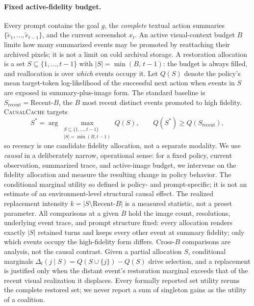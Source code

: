 \documentclass[letterpaper]{article} %
\newcommand{\method}{\textsc{CausalCache}}
\begin{document}
\paragraph{Fixed active-fidelity budget.}
Every prompt contains the goal $g$, the \emph{complete} textual action
summaries $\{\tilde e_1,\ldots,\tilde e_{t-1}\}$, and the current screenshot
$x_t$. An active visual-context budget $B$ limits how many summarized events
may be promoted by reattaching their archived pixels; it is not a limit on
cold archival storage. A restoration allocation is a set
$S\subseteq\{1,\ldots,t-1\}$ with $|S|=\min(B,\,t{-}1)$: the budget is
always filled, and reallocation is over \emph{which} events occupy it. Let
$Q(S)$ denote the policy's mean target-token log-likelihood of the successful
next action when events in $S$ are exposed in summary-plus-image form. The
standard baseline is $S_{\mathrm{recent}}=\mathrm{Recent}\text{-}B$, the $B$
most recent distinct events promoted to high fidelity. \method{} targets
\begin{equation}
S^{*}=\arg\max_{\substack{S\subseteq\{1,\ldots,t-1\}\\ |S|=\min(B,t-1)}} Q(S),
\qquad
Q(S^{*})\ge Q(S_{\mathrm{recent}}),
\label{eq:decision}
\end{equation}
so recency is one candidate fidelity allocation, not a separate modality.
We use \emph{causal} in a deliberately narrow, operational sense: for a
fixed policy, current observation, summarized trace, and active-image
budget, we intervene on the fidelity allocation and measure the resulting
change in policy behavior. The conditional marginal utility so defined is
policy- and prompt-specific; it is not an estimate of an
environment-level structural causal effect. The
realized replacement intensity $k=|S\setminus \mathrm{Recent}\text{-}B|$ is a
measured statistic, not a preset parameter. All comparisons at a given $B$
hold the image count, resolutions, underlying event trace, and prompt
structure fixed: every allocation renders exactly $|S|$ retained turns and
keeps every other event at summary fidelity; only which events occupy the
high-fidelity form differs. Cross-$B$ comparisons are
analysis, not the causal contrast. Given a partial allocation $S$, conditional
marginals
$\Delta_t(j\mid S)=Q(S\cup\{j\})-Q(S)$ drive selection, and a replacement is
justified only when the distant event's restoration marginal exceeds that of
the recent visual realization it displaces. Every formally reported set
utility reruns the complete restored set; we never report a sum of singleton
gains as the utility of a coalition.
\end{document}

